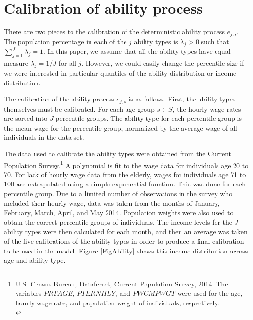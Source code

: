 \documentclass[letterpaper,12pt]{article}
\theoremstyle{definition}
\begin{document}
\newpage
\section{Calibration of ability process}\label{AppAbilCalib}

  \setcounter{equation}{0}

  There are two pieces to the calibration of the deterministic ability process $e_{j,s}$. The population percentage in each of the $j$ ability types is $\lambda_j>0$ such that $\sum_{j=1}^J \lambda_j = 1$. In this paper, we assume that all the ability types have equal measure $\lambda_j= 1/J$ for all $j$. However, we could easily change the percentile size if we were interested in particular quantiles of the ability distribution or income distribution.

  The calibration of the ability process $e_{j,s}$ is as follows.  First, the ability types themselves must be calibrated. For each age group $s \in S$, the hourly wage rates are sorted into $J$ percentile groups.  The ability type for each percentile group is the mean wage for the percentile group, normalized by the average wage of all individuals in the data set.

  The data used to calibrate the ability types were obtained from the Current Population Survey.\footnote{U.S. Census Bureau, Dataferret, Current Population Survey, 2014. The variables $PRTAGE$, $PTERNHLY$, and $PWCMPWGT$ were used for the age, hourly wage rate, and population weight of individuals, respectively. \\ [-2pt]} A polynomial is fit to the wage data for individuals age 20 to 70.  For lack of hourly wage data from the elderly, wages for individuals age 71 to 100 are extrapolated using a simple exponential function. This was done for each percentile group.  Due to a limited number of observations in the survey who included their hourly wage, data was taken from the months of January, February, March, April, and May 2014.  Population weights were also used to obtain the correct percentile groups of individuals.  The income levels for the $J$ ability types were then calculated for each month, and then an average was taken of the five calibrations of the ability types in order to produce a final calibration to be used in the model. Figure \ref{FigAbility} shows this income distribution across age and ability type.
\end{document}
